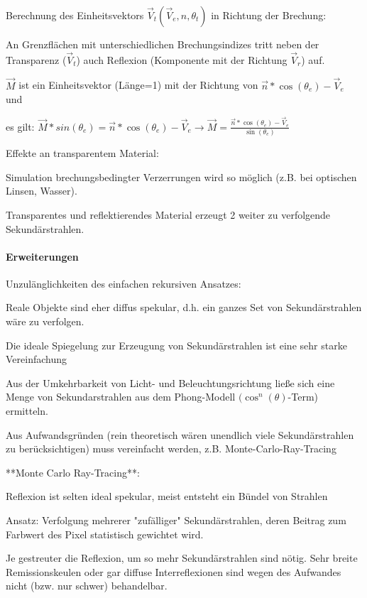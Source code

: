 \documentclass[landscape]{article}
\begin{document}
\begin{multicols}{3}
  Berechnung des Einheitsvektors $\vec{V}_t(\vec{V}_e,n,\theta_t)$ in Richtung der Brechung:
  \begin{itemize*}
    \item An Grenzflächen mit unterschiedlichen Brechungsindizes tritt neben der Transparenz ($\vec{V}_t$) auch Reflexion (Komponente mit der Richtung $\vec{V}_r$) auf.
    \item $\vec{M}$ ist ein Einheitsvektor (Länge=1) mit der Richtung von $\vec{n}*\cos(\theta_e)-\vec{V}_e$ und
    \item es gilt: $\vec{M}*sin(\theta_e)=\vec{n}*\cos(\theta_e)-\vec{V}_e \rightarrow \vec{M}=\frac{\vec{n}*\cos(\theta_e)-\vec{V}_e}{\sin(\theta_e)}$
    \item Effekte an transparentem Material:
    \item Simulation brechungsbedingter Verzerrungen wird so möglich (z.B. bei optischen Linsen, Wasser).
    \item Transparentes und reflektierendes Material erzeugt 2 weiter zu verfolgende Sekundärstrahlen.
  \end{itemize*}
  
  
  
  \paragraph{Erweiterungen}
  Unzulänglichkeiten des einfachen rekursiven Ansatzes:
  \begin{itemize*}
    \item Reale Objekte sind eher diffus spekular, d.h. ein ganzes Set von Sekundärstrahlen wäre zu verfolgen.
    \item Die ideale Spiegelung zur Erzeugung von Sekundärstrahlen ist eine sehr starke Vereinfachung
    \item Aus der Umkehrbarkeit von Licht- und Beleuchtungsrichtung ließe sich eine Menge von Sekundarstrahlen aus dem Phong-Modell $(\cos^n(\theta)$-Term) ermitteln.
    \item Aus Aufwandsgründen (rein theoretisch wären unendlich viele Sekundärstrahlen zu berücksichtigen) muss vereinfacht werden, z.B. Monte-Carlo-Ray-Tracing
  \end{itemize*}
  
  **Monte Carlo Ray-Tracing**:
  \begin{itemize*}
    \item Reflexion ist selten ideal spekular, meist entsteht ein Bündel von Strahlen
    \item Ansatz: Verfolgung mehrerer "zufälliger" Sekundärstrahlen, deren Beitrag zum Farbwert des Pixel statistisch gewichtet wird.
    \item Je gestreuter die Reflexion, um so mehr Sekundärstrahlen sind nötig. Sehr breite Remissionskeulen oder gar diffuse Interreflexionen sind wegen des Aufwandes nicht (bzw. nur schwer) behandelbar.
  \end{itemize*}
  

\end{multicols}
\end{document}
